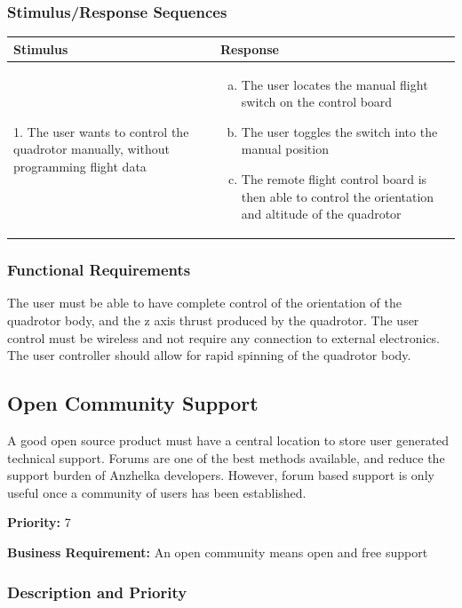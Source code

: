 \documentclass[english]{article}
\numberwithin{equation}{section} %
\begin{document}
\subsubsection{Stimulus/Response Sequences}

\begin{longtable}{p{3cm} | p{8.5cm}}
\hline
\textbf{Stimulus} & \textbf{Response}\\
\hline
1. The user wants to control the quadrotor manually, without programming flight data &
\begin{enumerate}[(a)]\itemsep1pt %
\item The user locates the manual flight switch on the control board
\item The user toggles the switch into the manual position
\item The remote flight control board is then able to control the orientation and altitude of the quadrotor
\end{enumerate}
\\ 
\hline
\end{longtable}
\subsubsection{Functional Requirements}
The user must be able to have complete control of the orientation of the quadrotor body, and the z axis thrust produced by the quadrotor. The user control must be wireless and not require any connection to external electronics. The user controller should allow for rapid spinning of the quadrotor body.

\bigskip

\subsection{Open Community Support}
A good open source product must have a central location to store user generated technical support. Forums are one of the best methods available, and reduce the support burden of Anzhelka developers. However, forum based support is only useful once a community of users has been established.

\textbf{Priority:} 7

\textbf{Business Requirement:} An open community means open and free support
\subsubsection{Description and Priority}
\end{document}
